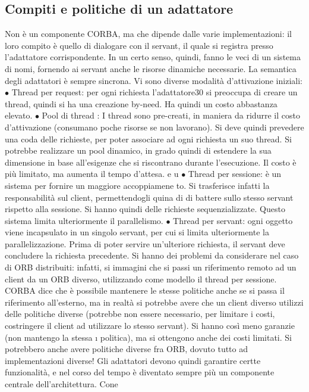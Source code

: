 \subsection{Compiti e politiche di un adattatore}
Non è un componente CORBA, ma che dipende dalle varie implementazioni:
il loro compito è quello di dialogare con il servant, il quale si registra presso
l'adattatore corrispondente. In un certo senso, quindi, fanno le veci di un sistema
di nomi, fornendo ai servant anche le risorse dinamiche necessarie.
La semantica degli adattatori è sempre sincrona. Vi sono diverse modalità
d'attivazione iniziali:
$\bullet$ Thread per request: per ogni richiesta l'adattatore30 si preoccupa di creare
un thread, quindi si ha una creazione by-need. Ha quindi un costo abbastanza elevato.
$\bullet$ Pool di thread : I thread sono pre-creati, in maniera da ridurre il costo
d'attivazione (consumano poche risorse se non lavorano). Si deve quindi
prevedere una coda delle richieste, per poter associare ad ogni richiesta un
suo thread.
Si potrebbe realizzare un pool dinamico, in grado quindi di estendere la
sua dimensione in base all'esigenze che si riscontrano durante l'esecuzione.
Il costo è più limitato, ma aumenta il tempo d'attesa.
e u
$\bullet$ Thread per sessione: è un sistema per fornire un maggiore accoppiamene
to. Si trasferisce infatti la responsabilità sul client, permettendogli quina
di di battere sullo stesso servant rispetto alla sessione. Si hanno quindi delle richieste sequenzializzate. Questo
sistema limita ulteriormente il
parallelismo.
$\bullet$ Thread per servant: ogni oggetto viene incapsulato in un singolo servant,
per cui si limita ulteriormente la parallelizzazione. Prima di poter servire
un'ulteriore richiesta, il servant deve concludere la richiesta precedente.
Si hanno dei problemi da considerare nel caso di ORB distribuiti: infatti, si
immagini che si passi un riferimento remoto ad un client da un ORB diverso,
utilizzando come modello il thread per sessione. CORBA dice che è possibile
mantenere le stesse politiche anche se si passa il riferimento all'esterno, ma
in realtà si potrebbe avere che un client diverso utilizzi delle politiche diverse
(potrebbe non essere necessario, per limitare i costi, costringere il client ad utilizzare lo stesso servant). Si hanno
così meno garanzie (non mantengo la stessa
\i{}
politica), ma si ottengono anche dei costi limitati. Si potrebbero anche avere
politiche diverse fra ORB, dovuto tutto ad implementazioni diverse!
Gli adattatori devono quindi garantire certte funzionalità, e nel corso del
tempo è diventato sempre più un componente centrale dell'architettura. Cone

